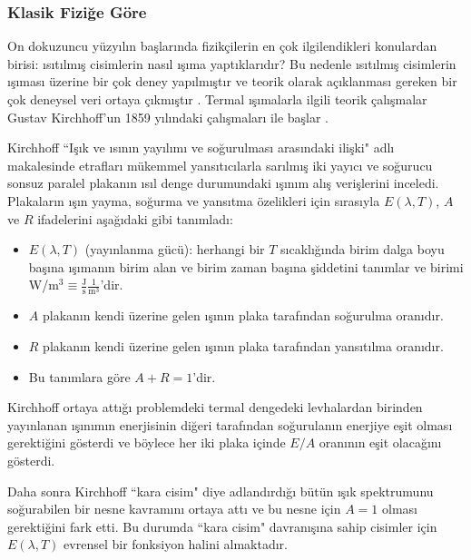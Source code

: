 \documentclass[a4paper,12pt, twoside]{article}
\begin{document}


\subsubsection{Klasik Fiziğe Göre}
On dokuzuncu yüzyılın başlarında fizikçilerin en çok ilgilendikleri konulardan birisi:
ısıtılmış cisimlerin nasıl ışıma yaptıklarıdır? Bu nedenle ısıtılmış cisimlerin ışıması üzerine bir çok deney yapılmıştır ve teorik olarak açıklanması gereken bir çok deneysel veri ortaya çıkmıştır \cite{book:Sharkov}. Termal ışımalarla ilgili teorik çalışmalar Gustav Kirchhoff'un 1859 yılındaki çalışmaları ile başlar \cite{book:Gasiorowicz}. 

Kirchhoff ``Işık ve ısının yayılımı ve soğurulması arasındaki ilişki" \cite{book:Jammer, Kirchhoff1859} adlı makalesinde etrafları mükemmel yansıtıcılarla sarılmış iki yayıcı ve soğurucu sonsuz paralel plakanın ısıl denge durumundaki ışınım alış verişlerini inceledi. Plakaların ışın yayma, soğurma ve yansıtma özelikleri için sırasıyla $E(\lambda, T)$, $A$ ve $R$ ifadelerini aşağıdaki gibi tanımladı:

\begin{itemize}
\item $E(\lambda, T)$ (yayınlanma gücü): herhangi bir $T$ sıcaklığında  birim dalga boyu başına ışımanın birim alan ve birim zaman başına şiddetini tanımlar ve birimi W/m$^3\equiv \frac{\text{J}}{\text{s}} \frac{1}{\text{m}^3}$'dir.
\item $A$ plakanın kendi üzerine gelen ışının plaka tarafından soğurulma oranıdır.
\item $R$ plakanın kendi üzerine gelen ışının plaka tarafından yansıtılma  oranıdır.
\item Bu tanımlara göre $A + R = 1$'dir.
\end{itemize}

Kirchhoff ortaya attığı problemdeki termal dengedeki levhalardan birinden yayınlanan ışınımın enerjisinin diğeri tarafından soğurulanın enerjiye eşit olması gerektiğini gösterdi ve böylece her iki plaka içinde $E/A$ oranının eşit olacağını gösterdi.

Daha sonra Kirchhoff ``kara cisim" diye adlandırdığı bütün ışık spektrumunu soğurabilen bir nesne kavramını ortaya attı ve bu nesne için $A=1$ olması gerektiğini fark etti. Bu durumda ``kara cisim" davranışına sahip cisimler için $E(\lambda, T)$  evrensel bir fonksiyon halini almaktadır.
\end{document}
